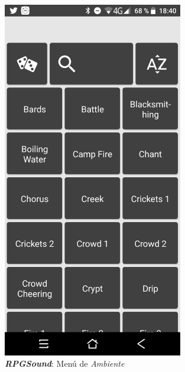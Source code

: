 \begin{figure}[H]
\begin{minipage}{0.3\textwidth}
        \includegraphics[width=0.7\textwidth]{Images/RPGSound_2.jpeg}
        \caption{\textit{\textbf{RPGSound}}: Menú de \textit{Ambiente}}
        \label{RPGSound2} 
    \end{minipage}
\end{figure}

